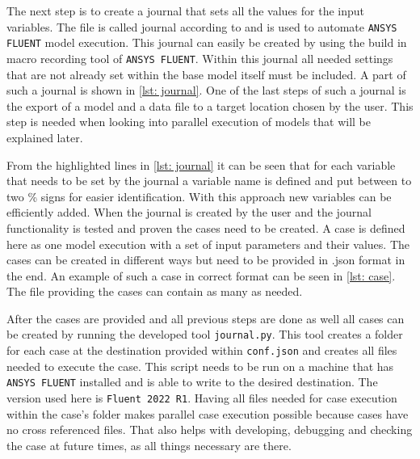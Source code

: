 \documentclass[../thesis.tex]{subfiles}
\begin{document}
The next step is to create a journal that sets all the values for the input variables. The file is called journal according to \cite{manual2009ansys} and is used to automate \texttt{ANSYS FLUENT} model execution. This journal can easily be created by using the build in macro recording tool of \texttt{ANSYS FLUENT}. Within this journal all needed settings that are not already set within the base model itself must be included. A part of such a journal is shown in \autoref{lst: journal}. One of the last steps of such a journal is the export of a model and a data file to a target location chosen by the user. This step is needed when looking into parallel execution of models that will be explained later.

% 
%



From the highlighted lines in \autoref{lst: journal} it can be seen that for each variable that needs to be set by the journal a variable name is defined and put between to two \% signs for easier identification. With this approach new variables can be efficiently added. When the journal is created by the user and the journal functionality is tested and proven the cases need to be created. A case is defined here as one model execution with a set of input parameters and their values. The cases can be created in different ways but need to be provided in .json format in the end. An example of such a case in correct format can be seen in \autoref{lst: case}. The file providing the cases can contain as many as needed. 



After the cases are provided and all previous steps are done as well all cases can be created by running the developed tool \texttt{journal.py}.
This tool creates a folder for each case at the destination provided within \texttt{conf.json} and creates all files needed to execute the case. This script needs to be run on a machine that has \texttt{ANSYS FLUENT} installed and is able to write to the desired destination. The version used here is \texttt{Fluent 2022 R1}. Having all files needed for case execution within the case's folder makes parallel case execution possible because cases have no cross referenced files. That also helps with developing, debugging and checking the case at future times, as all things necessary are there.
\end{document}
